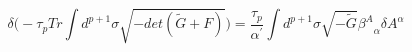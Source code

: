 \begin{equation}
\delta\bigl(-\tau_p Tr\int d^{p+1}\sigma\sqrt{-det(\tilde
G+F)}\bigr)=\frac{\tau_p}{\alpha^\prime}\int
d^{p+1}\sigma\sqrt{-\tilde G}{\beta^A}_\alpha\delta A^\alpha
\end{equation}

